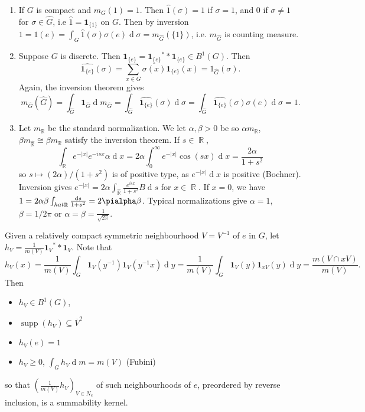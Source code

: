 \documentclass[11pt, a4paper]{memoir}
\DeclareMathOperator{\R}{{\mathbb{R}}}
\theoremstyle{change}
\theoremstyle{plain}
\theoremstyle{nonumberplain}
\DeclareMathOperator{\supp}{supp}
\renewcommand{\d}[1]{\ensuremath{\operatorname{d}\!{#1}}}
\newcommand{\idc}[1]{\ensuremath{\mathbf{1}_{#1}}}
\numberwithin{equation}{section}
\begin{document}
\begin{enumerate}[nl]
    \item If $G$ is compact and $m_G(1)=1$.
        Then $\hat{1}(\sigma)=1$ if $\sigma=1$, and $0$ if $\sigma\neq 1$ for $\sigma\in\widehat{G}$, i.e $\hat{1}=\idc{\{1\}}$ on $G$.
        Then by inversion $1=1(e)=\int_G\hat{1}(\sigma)\sigma(e)\d{\sigma}=m_{\widehat{G}}(\{1\})$, i.e. $m_{\widehat{G}}$ is counting measure.
    \item Suppose $G$ is discrete.
        Then $\idc{\{e\}}=\idc{\{e\}}^**\idc{\{e\}}\in B^1(G)$.
        Then
        \begin{equation*}
            \widehat{\idc{\{e\}}}(\sigma)=\sum_{x\in G}\overline{\sigma(x)}\idc{\{e\}}(x)=1_{\widehat{G}}(\sigma).
        \end{equation*}
        Again, the inversion theorem gives
        \begin{equation*}
            m_{\widehat{G}}(\widehat{G}) = \int_{\widehat{G}}\idc{\widehat{G}}\d{m_{\widehat{G}}}=\int_{\widehat{G}}\hat{\idc{\{e\}}}(\sigma)\d{\sigma}=\int_{\widehat{G}}\hat{\idc{\{e\}}}(\sigma)\sigma(e)\d{\sigma}=1.
        \end{equation*}
    \item Let $m_{\R}$ be the standard normalization.
        We let $\alpha,\beta>0$ be so $\alpha m_{\R}$, $\beta m_{\hat{\R}}\cong\beta m_{\R}$ satisfy the inversion theorem.
        If $s\in\R$,
        \begin{equation*}
            \int_{\R}e^{-|x|}e^{-isx}\alpha\d{x}=2\alpha\int_0^\infty e^{-|x|}\cos(sx)\d{x}=\frac{2\alpha}{1+s^2}
        \end{equation*}
        so $s\mapsto (2\alpha)/(1+s^2)$ is of positive type, as $e^{-|x|}\d{x}$ is positive (Bochner).
        Inversion gives $e^{-|x|}=2\alpha\int_{\hat{\R}}\frac{e^{isx}}{1+s^2}B\d{s}$ for $x\in\R$.
        If $x=0$, we have $1=2\alpha\beta\int_{hat{\R}}\frac{\d{s}}{1+s^2}=2\pialpha\beta$.
        Typical normalizations give $\alpha=1$, $\beta=1/2\pi$ or $\alpha=\beta=\frac{1}{\sqrt{2\pi}}$.
\end{enumerate}
Given a relatively compact symmetric neighbourhood $V=V^{-1}$ of $e$ in $G$, let $h_V=\frac{1}{m(V)}\idc{V}^**\idc{V}$.
Note that
\begin{equation*}
    h_V(x) = \frac{1}{m(V)}\int_G\idc{V}(y^{-1})\idc{V}(y^{-1}x)\d{y}=\frac{1}{m(V)}\int_G\idc{V}(y)\idc{xV}(y)\d{y} = \frac{m(V\cap xV)}{m(V)}.
\end{equation*}
Then
\begin{itemize}[nl]
    \item $h_V\in B^1(G)$,
    \item $\supp(h_V)\subseteq\overline{V}^2$
    \item $h_V(e)=1$
    \item $h_V\geq 0$, $\int_Gh_V\d{m}=m(V)$ (Fubini)
\end{itemize}
so that $\left(\frac{1}{m(V)}h_V\right)_{V\in N_e}$ of such neighbourhoods of $e$, preordered by reverse inclusion, is a summability kernel.
\end{document}
